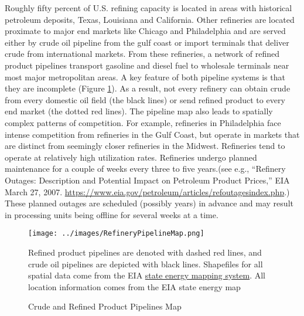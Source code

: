 \documentclass[12pt]{article}
\begin{document}
Roughly fifty percent of U.S. refining capacity is located in areas with historical petroleum deposits, Texas, Louisiana and California.  Other refineries are located proximate to major end markets like Chicago and Philadelphia and are served either by crude oil pipeline from the gulf coast or import terminals that deliver crude from international markets.  From these refineries, a network of refined product pipelines transport gasoline and diesel fuel to wholesale terminals near most major metropolitan areas. A key feature of both pipeline systems is that they are incomplete (Figure \ref{fig:pipeline_map}). As a result, not every refinery can obtain crude from every domestic oil field (the black lines) or send refined product to every end market (the dotted red lines). The pipeline map also leads to spatially complex patterns of competition. For example, refineries in Philadelphia face intense competition from refineries in the Gulf Coast, but operate in markets that are distinct from seemingly closer refineries in the Midwest.  Refineries tend to operate at relatively high utilization rates. Refineries undergo planned maintenance for a couple of weeks every three to five years.(see e.g., ``Refinery Outages: Description and Potential Impact on Petroleum Product Prices,'' EIA March 27, 2007. \href{https://www.eia.gov/petroleum/articles/refoutagesindex.php}{https://www.eia.gov/petroleum/articles/refoutagesindex.php}.)  These planned outages are scheduled (possibly years) in advance and may result in processing units being offline for several weeks at a time.

\begin{figure}[]
  \begin{centering}
  \caption{Crude and Refined Product Pipelines Map \label{fig:pipeline_map}}
  \texttt{[image: ../images/RefineryPipelineMap.png]}
  \par\end{centering}
  \vspace{4pt}
  \scriptsize
  Refined product pipelines are denoted with dashed red lines, and crude oil pipelines are depicted with black lines. Shapefiles for all spatial data come from the EIA \href{https://www.eia.gov/maps/layer_info-m.php}{state energy mapping system}.  All location information comes from the EIA state energy map
\end{figure}
\end{document}
